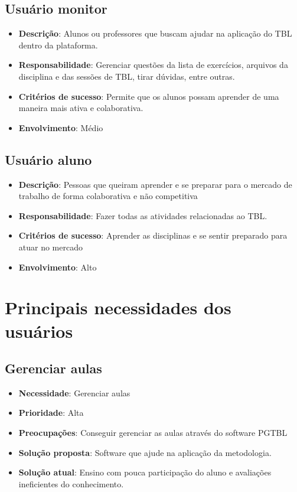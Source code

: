 \subsection{Usuário monitor}

\begin{itemize}
  \item \textbf{Descrição}: Alunos ou professores que buscam ajudar na aplicação do TBL dentro da plataforma.
  \item \textbf{Responsabilidade}: Gerenciar questões da lista de exercícios, arquivos da disciplina e das sessões de TBL, tirar dúvidas, entre outras.
  \item \textbf{Critérios de sucesso}: Permite que os alunos possam aprender de uma maneira mais ativa e colaborativa.
  \item \textbf{Envolvimento}: Médio
\end{itemize}

\subsection{Usuário aluno}

\begin{itemize}
  \item \textbf{Descrição}: Pessoas que queiram aprender e se preparar para o mercado de trabalho de forma colaborativa e não competitiva
  \item \textbf{Responsabilidade}: Fazer todas as atividades relacionadas ao TBL.
  \item \textbf{Critérios de sucesso}: Aprender as disciplinas e se sentir preparado para atuar no mercado
  \item \textbf{Envolvimento}: Alto
\end{itemize}


\section{Principais necessidades dos usuários}

\subsection{Gerenciar aulas}

\begin{itemize}
  \item \textbf{Necessidade}: Gerenciar aulas
  \item \textbf{Prioridade}: Alta
  \item \textbf{Preocupações}: Conseguir gerenciar as aulas através do software PGTBL
  \item \textbf{Solução proposta}: Software que ajude na aplicação da metodologia.
  \item \textbf{Solução atual}: Ensino com pouca participação do aluno e avaliações ineficientes do conhecimento.
\end{itemize}

